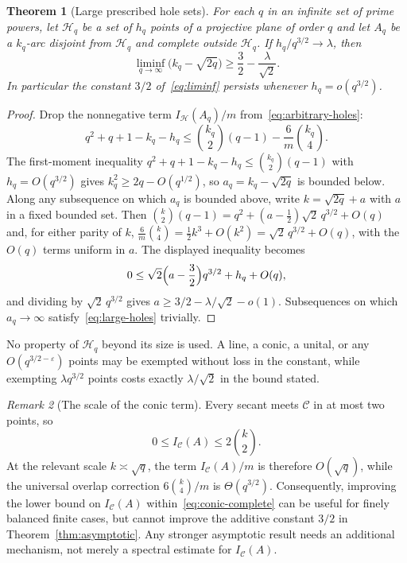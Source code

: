 \documentclass[11pt]{article}
\newtheorem{theorem}{Theorem}[section]
\theoremstyle{definition}
\theoremstyle{remark}
\newtheorem{remark}[theorem]{Remark}
\newcommand{\cC}{\mathcal{C}}
\newcommand{\cH}{\mathcal{H}}
\newcommand{\IC}{I_{\cC}}
\newcommand{\IH}{I_{\cH}}
\begin{document}
\begin{theorem}[Large prescribed hole sets]
\label{thm:large-holes}
For each $q$ in an infinite set of prime powers, let $\cH_q$ be a set of
$h_q$ points of a projective plane of order $q$ and let $A_q$ be a
$k_q$-arc disjoint from $\cH_q$ and complete outside $\cH_q$.  If
$h_q/q^{3/2}\to\lambda$, then
\begin{equation}
 \liminf_{q\to\infty}\bigl(k_q-\sqrt{2q}\bigr)\ge\frac32-\frac{\lambda}{\sqrt2}.
\label{eq:large-holes}
\end{equation}
In particular the constant $3/2$ of~\eqref{eq:liminf} persists whenever
$h_q=o(q^{3/2})$.
\end{theorem}

\begin{proof}
Drop the nonnegative term $\IH(A_q)/m$ from~\eqref{eq:arbitrary-holes}:
\[
 q^2+q+1-k_q-h_q\le\binom{k_q}{2}(q-1)-\frac6m\binom{k_q}{4}.
\]
The first-moment inequality $q^2+q+1-k_q-h_q\le\binom{k_q}{2}(q-1)$ with
$h_q=O(q^{3/2})$ gives $k_q^2\ge2q-O(q^{1/2})$, so $a_q=k_q-\sqrt{2q}$ is
bounded below.  Along any subsequence on which $a_q$ is bounded above,
write $k=\sqrt{2q}+a$ with $a$ in a fixed bounded set.  Then
$\binom{k}{2}(q-1)=q^2+(a-\tfrac12)\sqrt2\,q^{3/2}+O(q)$ and, for either
parity of $k$, $\frac6m\binom{k}{4}=\tfrac12k^3+O(k^2)=\sqrt2\,q^{3/2}+O(q)$,
with the $O(q)$ terms uniform in $a$.  The displayed inequality becomes
\[
 0\le\sqrt2\Bigl(a-\frac32\Bigr)q^{3/2}+h_q+O(q),
\]
and dividing by $\sqrt2\,q^{3/2}$ gives $a\ge3/2-\lambda/\sqrt2-o(1)$.
Subsequences on which $a_q\to\infty$ satisfy~\eqref{eq:large-holes}
trivially.
\end{proof}

No property of $\cH_q$ beyond its size is used.  A line, a conic, a
unital, or any $O(q^{3/2-\varepsilon})$ points may be exempted without
loss in the constant, while exempting $\lambda q^{3/2}$ points costs
exactly $\lambda/\sqrt2$ in the bound stated.

\begin{remark}[The scale of the conic term]
\label{rem:scale}
Every secant meets $\cC$ in at most two points, so
\[
 0\le\IC(A)\le2\binom{k}{2}.
\]
At the relevant scale $k\asymp\sqrt q$, the term $\IC(A)/m$ is therefore
$O(\sqrt q)$, while the universal overlap correction
$6\binom{k}{4}/m$ is $\Theta(q^{3/2})$.  Consequently, improving the lower
bound on $\IC(A)$ within~\eqref{eq:conic-complete} can be useful for finely
balanced finite cases, but cannot improve the additive constant $3/2$ in
Theorem~\ref{thm:asymptotic}.  Any stronger asymptotic result needs an
additional mechanism, not merely a spectral estimate for $\IC(A)$.
\end{remark}
\end{document}
